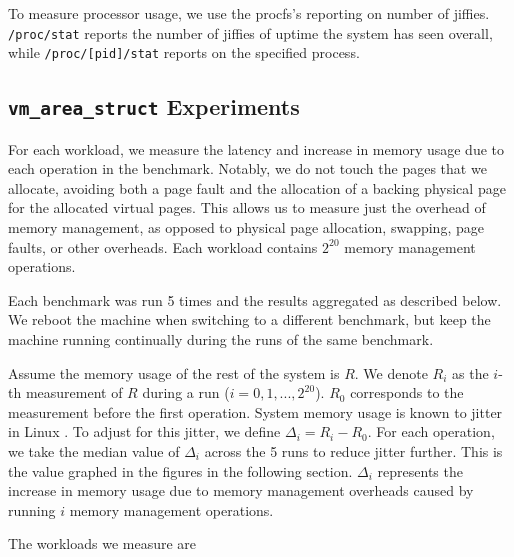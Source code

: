 \documentclass[twocolumn,11pt]{article}
\begin{document}
To measure processor usage, we use the procfs's reporting on number of jiffies.
\texttt{/proc/stat} reports the number of jiffies of uptime the system has seen
overall, while \texttt{/proc/[pid]/stat} reports on the specified process.

\subsection{\texttt{vm\_area\_struct} Experiments}
\label{ss_vm_area_struct}

For each workload, we measure the latency and increase in memory usage due to
each operation in the benchmark. Notably, we do not touch the pages that we
allocate, avoiding both a page fault and the allocation of a backing physical page
for the allocated virtual pages. This allows us to measure just the overhead of
memory management, as opposed to physical page allocation, swapping, page
faults, or other overheads.  Each workload contains $2^{20}$ memory management
operations.

Each benchmark was run 5 times and the results aggregated as described below. We
reboot the machine when switching to a different benchmark, but keep the machine
running continually during the runs of the same benchmark. 

Assume the memory usage of the rest of the system is $R$. We denote $R_i$ as
the $i$-th measurement of $R$ during a run ($i = 0, 1, ..., 2^{20}$). $R_0$
corresponds to the measurement before the first operation. System memory usage
is known to jitter in Linux \cite{jitter}. To adjust for this jitter, we define
$\Delta_i = R_i - R_0$. For each operation, we take the median value of
$\Delta_i$ across the 5 runs to reduce jitter further.  This is the value
graphed in the figures in the following section. $\Delta_i$ represents the
increase in memory usage due to memory management overheads caused by running
$i$ memory management operations.

The workloads we measure are
\end{document}
